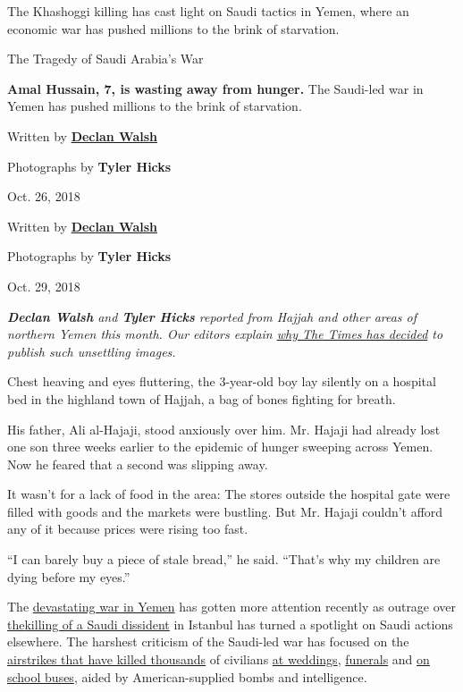 The Khashoggi killing has cast light on Saudi tactics in Yemen, where an
economic war has pushed millions to the brink of starvation.

The Tragedy of Saudi Arabia's War

\textbf{Amal Hussain, 7, is wasting away from hunger.} The Saudi-led war
in Yemen has pushed millions to the brink of starvation.

Written by \textbf{\href{https://www.nytimes.com/by/declan-walsh}{Declan
Walsh}}

Photographs by \textbf{Tyler Hicks}

Oct. 26, 2018

Written by \textbf{\href{https://www.nytimes.com/by/declan-walsh}{Declan
Walsh}}

Photographs by \textbf{Tyler Hicks}

Oct. 29, 2018

\emph{\textbf{Declan Walsh} and \textbf{Tyler Hicks} reported from
Hajjah and other areas of northern Yemen this month. Our editors explain
\href{https://www.nytimes.com/2018/10/26/reader-center/yemen-photos-starvation.html}{why
The Times has decided} to publish such unsettling images.}

Chest heaving and eyes fluttering, the 3-year-old boy lay silently on a
hospital bed in the highland town of Hajjah, a bag of bones fighting for
breath.

His father, Ali al-Hajaji, stood anxiously over him. Mr. Hajaji had
already lost one son three weeks earlier to the epidemic of hunger
sweeping across Yemen. Now he feared that a second was slipping away.

It wasn't for a lack of food in the area: The stores outside the
hospital gate were filled with goods and the markets were bustling. But
Mr. Hajaji couldn't afford any of it because prices were rising too
fast.

``I can barely buy a piece of stale bread,'' he said. ``That's why my
children are dying before my eyes.''

The
\href{https://www.nytimes.com/interactive/2018/10/20/world/middleeast/saudi-arabia-invisible-war-yemen.html}{devastating
war in Yemen} has gotten more attention recently as outrage over
\href{https://www.nytimes.com/2018/10/25/world/middleeast/saudi-arabia-jamal-khashoggi-turkey.html}{the}\href{https://www.nytimes.com/2018/10/25/world/middleeast/saudi-arabia-jamal-khashoggi-turkey.html}{killing
of a Saudi dissident} in Istanbul has turned a spotlight on Saudi
actions elsewhere. The harshest criticism of the Saudi-led war has
focused on the
\href{https://www.nytimes.com/2018/08/28/world/middleeast/un-yemen-war-crimes.html}{airstrikes
that have killed thousands} of civilians
\href{https://www.nytimes.com/2018/04/23/world/middleeast/yemen-wedding-bombing.html}{at
weddings},
\href{https://www.nytimes.com/2016/10/09/world/middleeast/yemen-saudi-arabia-houthis-rebels.html}{funerals}
and
\href{https://www.nytimes.com/2018/08/09/world/middleeast/yemen-airstrike-school-bus-children.html}{on
school buses}, aided by American-supplied bombs and intelligence.

